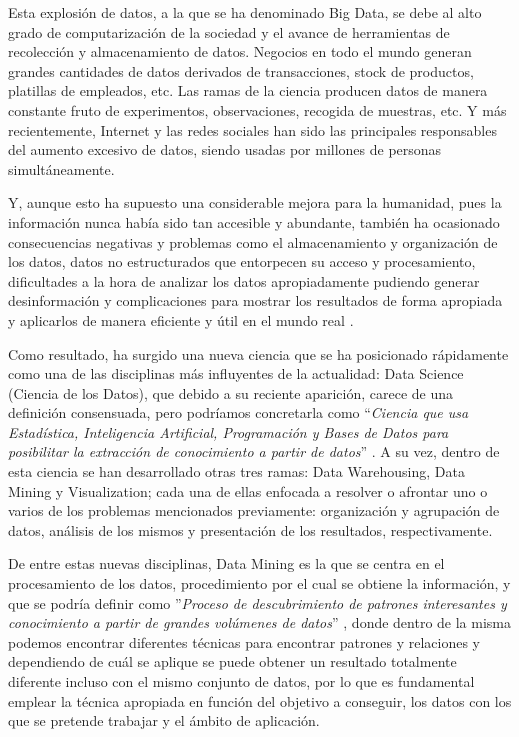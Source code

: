 \documentclass[10pt, a4paper]{article}
\begin{document}
Esta explosión de datos, a la que se ha denominado Big Data, se debe al alto grado de computarización de la sociedad y el avance de herramientas de recolección y almacenamiento de datos. Negocios en todo el mundo generan grandes cantidades de datos derivados de transacciones, stock de productos,  platillas de empleados, etc. Las ramas de la ciencia producen datos de manera constante fruto de experimentos, observaciones, recogida de muestras, etc. Y más recientemente, Internet y las redes sociales han sido las principales responsables del aumento excesivo de datos, siendo usadas por millones de personas simultáneamente.

Y, aunque esto ha supuesto una considerable mejora para la humanidad, pues la información nunca había sido tan accesible y abundante, también ha ocasionado consecuencias negativas y problemas como el almacenamiento y organización de los datos, datos no estructurados que entorpecen su acceso y procesamiento, dificultades a la hora de analizar los datos apropiadamente pudiendo generar desinformación y complicaciones para mostrar los resultados de forma apropiada y aplicarlos de manera eficiente y útil en el mundo real \cite{3}.

Como resultado, ha surgido una nueva ciencia que se ha posicionado rápidamente como una de las disciplinas más influyentes de la actualidad: Data Science (Ciencia de los Datos), que debido a su reciente aparición, carece de una definición consensuada, pero podríamos concretarla como ``\textit{Ciencia que usa Estadística, Inteligencia Artificial, Programación y Bases de Datos para posibilitar la extracción de conocimiento a partir de datos}'' \cite{4}. A su vez, dentro de esta ciencia se han desarrollado otras tres ramas: Data Warehousing, Data Mining y Visualization; cada una de ellas enfocada a resolver o afrontar uno o varios de los problemas mencionados previamente: organización y agrupación de datos, análisis de los mismos y presentación de los resultados, respectivamente.

De entre estas nuevas disciplinas, Data Mining es la que se centra en el procesamiento de los datos, procedimiento por el cual se obtiene la información, y que se podría definir como ''\textit{Proceso de descubrimiento de patrones interesantes y conocimiento a partir de grandes volúmenes de datos}'' \cite{LIBRO}, donde dentro de la misma podemos encontrar diferentes técnicas para encontrar patrones y relaciones y dependiendo de cuál se aplique se puede obtener un resultado totalmente diferente incluso con el mismo conjunto de datos, por lo que es fundamental emplear la técnica apropiada en función del objetivo a conseguir, los datos con los que se pretende trabajar y el ámbito de aplicación.
\end{document}
